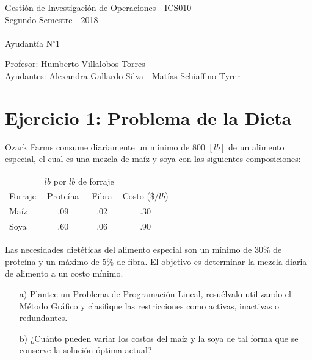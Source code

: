 \documentclass[letterpaper,11pt,oneside]{article}
\newcommand{\grad}{$^{\circ}$}
\begin{document}
	\begin{center}
		{\Large Gestión de Investigación de Operaciones - ICS010}\\
		{\large Segundo Semestre - 2018}\\
		\ \\
		{\large Ayudantía N\grad 1}
	\end{center}

	\begin{center}
		Profesor: Humberto Villalobos Torres\\
		Ayudantes: Alexandra Gallardo Silva - Matías Schiaffino Tyrer
	\end{center}

\section*{Ejercicio 1: Problema de la Dieta}

Ozark Farms consume diariamente un mínimo de 800 $[lb]$ de un alimento especial, el cual es una mezcla de maíz y soya con las siguientes composiciones:

\begin{table}[htb]
	\centering
	\begin{tabular}{l c c c}
		\hline\hline
		& \multicolumn{2}{c}{$lb$ por $lb$ de forraje} & \\
		\cline{2-3}
		Forraje & Proteína & Fibra & Costo ($\$/lb$)\\
		\hline
		Maíz & .09 & .02 & .30\\
		Soya & .60 & .06 & .90\\
		\hline\hline
	\end{tabular}
\end{table}

Las necesidades dietéticas del alimento especial son un mínimo de 30\% de proteína y un máximo de 5\% de fibra. El objetivo es determinar la mezcla diaria de alimento a un costo mínimo.

\begin{itemize}
	\item[a)] Plantee un Problema de Programación Lineal, resuélvalo utilizando el Método Gráfico y clasifique las restricciones como activas, inactivas o redundantes.
	\item[b)] ¿Cuánto pueden variar los costos del maíz y la soya de tal forma que se conserve la solución óptima actual?
\end{itemize}
\end{document}
